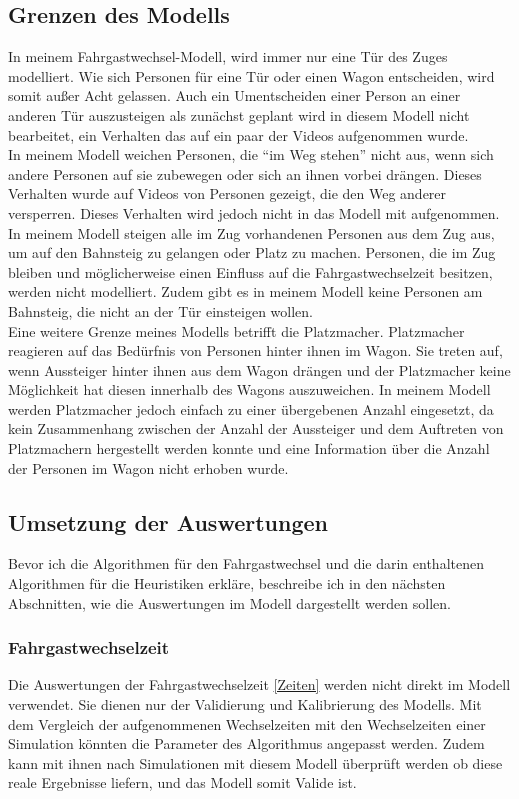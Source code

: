\subsection{Grenzen des Modells}
In meinem Fahrgastwechsel-Modell, wird immer nur eine Tür des Zuges modelliert. Wie sich Personen für eine Tür oder einen Wagon entscheiden, wird somit außer Acht gelassen. Auch ein Umentscheiden einer Person an einer anderen Tür auszusteigen als zunächst geplant wird in diesem Modell nicht bearbeitet, ein Verhalten das auf ein paar der Videos aufgenommen wurde.\\
In meinem Modell weichen Personen, die "`im Weg stehen"' nicht aus, wenn sich andere Personen auf sie zubewegen oder sich an ihnen vorbei drängen. Dieses Verhalten wurde auf Videos von Personen gezeigt, die den Weg anderer versperren. Dieses Verhalten wird jedoch nicht in das Modell mit aufgenommen. \\
In meinem Modell steigen alle im Zug vorhandenen Personen aus dem Zug aus, um auf den Bahnsteig zu gelangen oder Platz zu machen. Personen, die im Zug bleiben und möglicherweise einen Einfluss auf die Fahrgastwechselzeit besitzen, werden nicht modelliert. Zudem gibt es in meinem Modell keine Personen am Bahnsteig, die nicht an der Tür einsteigen wollen. \\
Eine weitere Grenze meines Modells betrifft die Platzmacher. Platzmacher reagieren auf das Bedürfnis von Personen hinter ihnen im Wagon. Sie treten auf, wenn Aussteiger hinter ihnen aus dem Wagon drängen und der Platzmacher keine Möglichkeit hat diesen innerhalb des Wagons auszuweichen. In meinem Modell werden Platzmacher jedoch einfach zu einer übergebenen Anzahl eingesetzt, da kein Zusammenhang zwischen der Anzahl der Aussteiger und dem Auftreten von Platzmachern hergestellt werden konnte und eine Information über die Anzahl der Personen im Wagon nicht erhoben wurde.
\subsection{Umsetzung der Auswertungen}
Bevor ich die Algorithmen für den Fahrgastwechsel und die darin enthaltenen Algorithmen für die Heuristiken erkläre, beschreibe ich in den nächsten Abschnitten, wie die Auswertungen im Modell dargestellt werden sollen.
\subsubsection{Fahrgastwechselzeit}
Die Auswertungen der Fahrgastwechselzeit \ref{Zeiten} werden nicht direkt im Modell verwendet. Sie dienen nur der Validierung und Kalibrierung des Modells. Mit dem Vergleich der aufgenommenen Wechselzeiten mit den Wechselzeiten einer Simulation könnten die Parameter des Algorithmus angepasst werden. Zudem kann mit ihnen nach Simulationen mit diesem Modell überprüft werden ob diese reale Ergebnisse liefern, und das Modell somit Valide ist.
